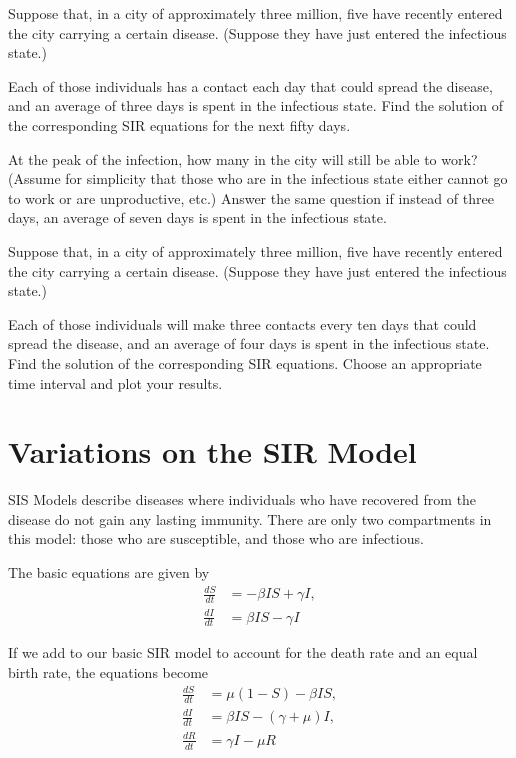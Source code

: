\begin{problem}
Suppose that, in a city of approximately three million, five have recently entered the city carrying a certain disease.
(Suppose they have just entered the infectious state.)

Each of those individuals has a contact each day that could spread the disease, and an average of three days is spent in the infectious state.
Find the solution of the corresponding SIR equations for the next fifty days.


At the peak of the infection, how many in the city will still be able to work? (Assume for simplicity that those who are in the infectious state either cannot go to work or are unproductive, etc.)
Answer the same question if instead of three days, an average of seven days is spent in the infectious state.
\end{problem}


\begin{problem}
Suppose that, in a city of approximately three million, five have recently entered the city carrying a certain disease.
(Suppose they have just entered the infectious state.)

Each of those individuals will make three contacts every ten days that could spread the disease, and an average of four days is spent in the infectious state.
Find the solution of the corresponding SIR equations.
Choose an appropriate time interval and plot your results.
\end{problem}

\section*{Variations on the SIR Model}

SIS Models describe diseases where individuals who have recovered from the disease do not gain
any lasting immunity.
There are only two compartments in this model: those who are susceptible, and those who are infectious.

The basic equations are given by
\begin{align*}
\frac{dS}{dt} &=-\beta I S + \gamma I ,\\
\frac{dI}{dt} &= \beta I S-\gamma I
\end{align*}

If we add to our basic SIR model to account for the death rate and an equal birth rate, the equations become
\begin{align*}
\frac{dS}{dt} &=\mu(1 -S) - \beta I S,\\
\frac{dI}{dt} &= \beta I S - (\gamma + \mu)I, \\
\frac{dR}{dt} &= \gamma I - \mu R
\end{align*}

